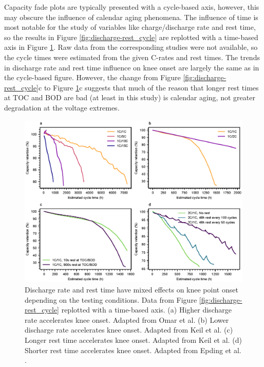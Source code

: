 \documentclass[journal=jpclcd,manuscript=article]{achemso}
\begin{document}
Capacity fade plots are typically presented with a cycle-based axis, however, this may obscure the influence of calendar aging phenomena. The influence of time is most notable for the study of variables like charge/discharge rate and rest time, so the results in Figure \ref{fig:discharge-rest_cycle} are replotted with a time-based axis in Figure \ref{fig:discharge-rest_time}. Raw data from the corresponding studies were not available, so the cycle times were estimated from the given C-rates and rest times. The trends in discharge rate and rest time influence on knee onset are largely the same as in the cycle-based figure. However, the change from Figure \ref{fig:discharge-rest_cycle}c to Figure \ref{fig:discharge-rest_time}c suggests that much of the reason that longer rest times at TOC and BOD are bad (at least in this study) is calendar aging, not greater degradation at the voltage extremes.    

\begin{figure}[ht]
\centering
\includegraphics[scale = 1.0]{figures/discharge_rate_rest_time.eps}
\caption{Discharge rate and rest time have mixed effects on knee point onset depending on the testing conditions. Data from Figure \ref{fig:discharge-rest_cycle} replotted with a time-based axis. (a) Higher discharge rate accelerates knee onset. Adapted from Omar et al. \cite{omar_lithium_2014} (b) Lower discharge rate accelerates knee onset. Adapted from Keil et al. \cite{keil_linear_2019} (c) Longer rest time accelerates knee onset. Adapted from Keil et al. \cite{keil_linear_2019} (d) Shorter rest time accelerates knee onset. Adapted from Epding et al. \cite{epding_investigation_2019}.}
\label{fig:discharge-rest_time}
\end{figure}



% 

\end{document}
